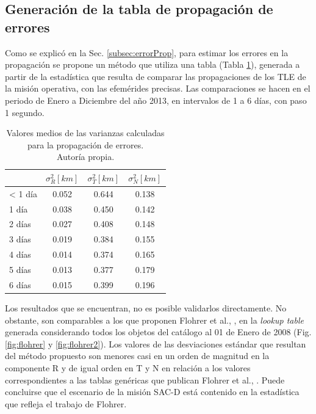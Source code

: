 \subsection*{Generaci\'on de la tabla de propagaci\'on de errores}

Como se explic\'o en la Sec. \ref{subsec:errorProp}, para estimar los errores en la propagaci\'on se propone un m\'etodo que utiliza una tabla (Tabla \ref{tab:resultatabla}), generada a partir de la estad\'istica que resulta de comparar las propagaciones de los TLE de la misi\'on operativa, con las efem\'erides precisas. Las comparaciones se hacen en el periodo de Enero a Diciembre del a\~no 2013, en intervalos de 1 a 6 d\'ias, con paso 1 segundo.

\begin{table}[!h]
\caption[Tabla con los valores medios para la propagaci\'on de errores.]{Valores medios de las varianzas calculadas\\ para la propagaci\'on de errores.\\ Autor\'ia propia.}
\begin{tabular}{lccc}
\hline \hline
\rowcolor{yellow!35}
&$\sigma^{2}_R [km]$ &$\sigma^{2}_T [km]$ &$\sigma^{2}_N [km]$\\
\hline \hline
< 1 d\'ia & 0.052& 0.644& 0.138\\
\hline
1 d\'ia & 0.038& 0.450& 0.142\\
\hline
2 d\'ias & 0.027& 0.408& 0.148\\
\hline
3 d\'ias & 0.019& 0.384& 0.155\\
\hline
4 d\'ias & 0.014& 0.374& 0.165\\
\hline
5 d\'ias & 0.013& 0.377& 0.179\\
\hline
6 d\'ias & 0.015& 0.399& 0.196\\
\hline
\end{tabular}
\label{tab:resultatabla}
\end{table}

Los resultados que se encuentran, no es posible validarlos directamente. No obstante, son comparables a los que proponen Flohrer et al., \citep{flohrer2008assessment}, en la {\it{lookup table}} generada considerando todos los objetos del cat\'alogo al 01 de Enero de 2008 (Fig.  \ref{fig:flohrer} y \ref{fig:flohrer2}). Los valores de las desviaciones est\'andar que resultan del m\'etodo propuesto son menores casi en un orden de magnitud en la componente R y de igual orden en T y N en relaci\'on a los valores correspondientes a las tablas gen\'ericas que publican Flohrer et al., \citep{flohrer2008assessment}. Puede concluirse que el escenario de la misi\'on SAC-D est\'a contenido en la estad\'istica que refleja el trabajo de Flohrer. 

